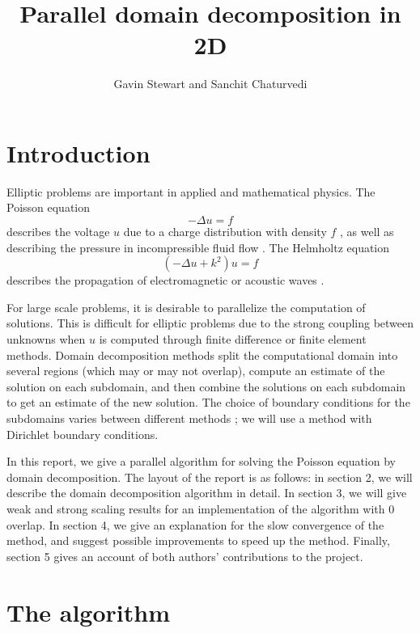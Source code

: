 \documentclass{article}
\title{Parallel domain decomposition in 2D}
\author{Gavin Stewart and Sanchit Chaturvedi}
\begin{document}
	\maketitle
	
	\section{Introduction}
	 
	Elliptic problems are important in applied and mathematical physics.  The Poisson equation 
	\begin{equation}
		-\Delta u = f
	\end{equation} describes the voltage \(u\) due to a charge distribution with density \(f\)%
	, as well as describing the pressure in incompressible fluid flow \cite{Marshall97}. The Helmholtz equation
	\begin{equation}
		(-\Delta u + k^2)u = f
	\end{equation} 
	describes the propagation of electromagnetic or acoustic waves \cite{Fairweather03}.
	
	For large scale problems, it is desirable to parallelize the computation of solutions.  This is difficult for elliptic problems due to the strong coupling between unknowns when \(u\) is computed through finite difference or finite element methods.  Domain decomposition methods split the computational domain into several regions (which may or may not overlap), compute an estimate of the solution on each  subdomain, and then combine the solutions on each subdomain to get an estimate of the new solution.  The choice of boundary conditions for the subdomains varies between different methods \cite{Dolean15}; we will use a method with Dirichlet boundary conditions.
	
	In this report, we give a parallel algorithm for solving the Poisson equation by domain decomposition.  The layout of the report is as follows: in section 2, we will describe the domain decomposition algorithm in detail.  In section 3, we will give weak and strong scaling results for an implementation of the algorithm with \(0\) overlap.  In section 4, we give an explanation for the slow convergence of the method, and suggest possible improvements to speed up the method.  Finally, section 5 gives an account of both authors' contributions to the project.
	
	\section{The algorithm}
	
\end{document}
